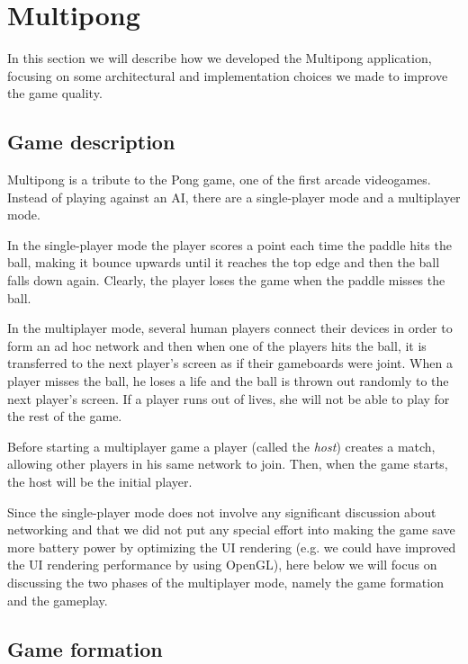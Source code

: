 \section{Multipong} %

In this section we will describe how we developed the Multipong application,
focusing on some architectural and implementation choices we made to improve
the game quality.

\subsection{Game description} %

Multipong is a tribute to the Pong game, one of the first arcade videogames.
Instead of playing against an AI, there are a single-player mode and a
multiplayer mode.

In the single-player mode the player scores a point each time the paddle hits
the ball, making it bounce upwards until it reaches the top edge and then the
ball falls down again. Clearly, the player loses the game when the paddle misses
the ball.

In the multiplayer mode, several human players connect their devices in order
to form an ad hoc network and then when one of the players hits the ball, it is
transferred to the next player's screen as if their gameboards were joint.
When a player misses the ball, he loses a life and the ball is thrown out
randomly to the next player's screen.
If a player runs out of lives, she will not be able to play for the rest of the
game.

Before starting a multiplayer game a player (called the \textit{host}) creates
a match, allowing other players in his same network to join. Then, when the
game starts, the host will be the initial player.

Since the single-player mode does not involve any significant discussion about
networking and that we did not put any special effort into making the game save
more battery power by optimizing the UI rendering (e.g. we could have improved
the UI rendering performance by using OpenGL), here below we will focus on
discussing the two phases of the multiplayer mode, namely the game formation
and the gameplay.

\subsection{Game formation}

